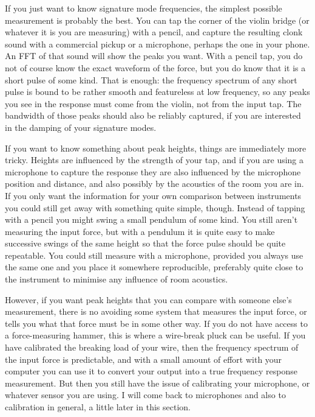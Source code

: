   If you just want to know signature mode frequencies, the simplest possible 
  measurement is probably the best. You can tap the corner of the violin bridge 
  (or whatever it is you are measuring) with a pencil, and capture the 
  resulting clonk sound with a commercial pickup or a microphone, perhaps the 
  one in your phone. An FFT of that sound will show the peaks you want. With a 
  pencil tap, you do not of course know the exact waveform of the force, but 
  you do know that it is a short pulse of some kind. That is enough: the 
  frequency spectrum of any short pulse is bound to be rather smooth and 
  featureless at low frequency, so any peaks you see in the response must come 
  from the violin, not from the input tap. The bandwidth of those peaks should 
  also be reliably captured, if you are interested in the damping of your 
  signature modes. 

  If you want to know something about peak heights, things are immediately more 
  tricky. Heights are influenced by the strength of your tap, and if you are 
  using a microphone to capture the response they are also influenced by the 
  microphone position and distance, and also possibly by the acoustics of the 
  room you are in. If you only want the information for your own comparison 
  between instruments you could still get away with something quite simple, 
  though. Instead of tapping with a pencil you might swing a small pendulum of 
  some kind. You still aren’t measuring the input force, but with a pendulum it 
  is quite easy to make successive swings of the same height so that the force 
  pulse should be quite repeatable. You could still measure with a microphone, 
  provided you always use the same one and you place it somewhere reproducible, 
  preferably quite close to the instrument to minimise any influence of room 
  acoustics. 

  However, if you want peak heights that you can compare with someone else’s 
  measurement, there is no avoiding some system that measures the input force, 
  or tells you what that force must be in some other way. If you do not have 
  access to a force-measuring hammer, this is where a wire-break pluck can be 
  useful. If you have calibrated the breaking load of your wire, then the 
  frequency spectrum of the input force is predictable, and with a small amount 
  of effort with your computer you can use it to convert your output into a 
  true frequency response measurement. But then you still have the issue of 
  calibrating your microphone, or whatever sensor you are using. I will come 
  back to microphones and also to calibration in general, a little later in 
  this section. 

